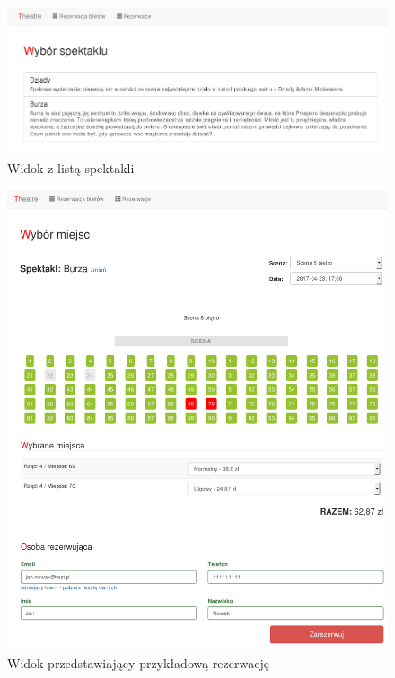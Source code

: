 \documentclass{mgr}
\begin{document}
\begin{figure}[!ht]
	\centering
	\includegraphics[width=\textwidth]{images/spectacles.png}
	\caption{Widok z listą spektakli}
	\label{fig:spectacles}
\end{figure}

\begin{figure}[!ht]
	\centering
	\includegraphics[width=\textwidth]{images/stages.png}
	\caption{Widok przedstawiający przykładową rezerwację}
	\label{fig:stages}
\end{figure}
\end{document}
